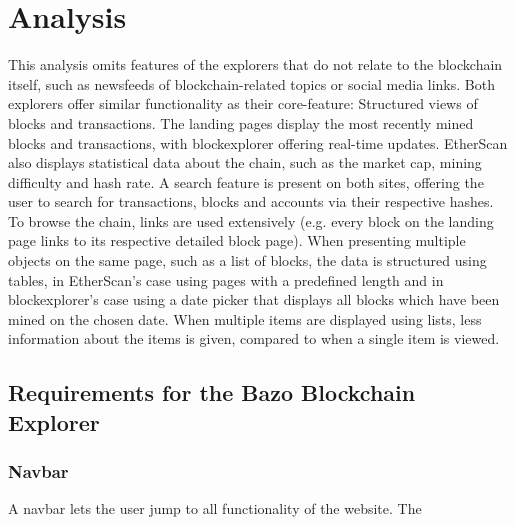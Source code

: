 \section{Analysis}
This analysis omits features of the explorers that do not relate to the blockchain itself, such as newsfeeds of blockchain-related topics or social media links. Both explorers offer similar functionality as their core-feature: Structured views of blocks and transactions. The landing pages display the most recently mined blocks and transactions, with blockexplorer offering real-time updates. EtherScan also displays statistical data about the chain, such as the market cap, mining difficulty and hash rate. A search feature is present on both sites, offering the user to search for transactions, blocks and accounts via their respective hashes. To browse the chain, links are used extensively (e.g. every block on the landing page links to its respective detailed block page). When presenting multiple objects on the same page, such as a list of blocks, the data is structured using tables, in EtherScan's case using pages with a predefined length and in blockexplorer's case using a date picker that displays all blocks which have been mined on the chosen date. When multiple items are displayed using lists, less information about the items is given, compared to when a single item is viewed.

\subsection{Requirements for the Bazo Blockchain Explorer}
\subsubsection{Navbar}
A navbar lets the user jump to all functionality of the website. The 